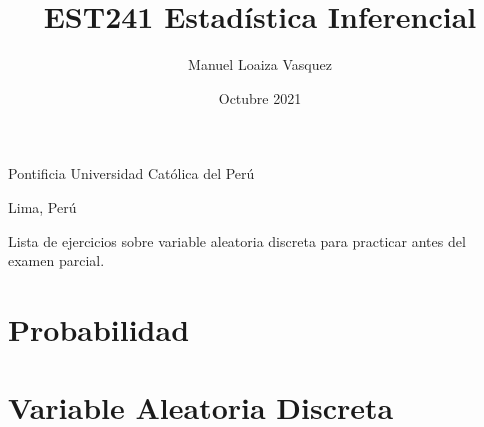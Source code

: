 \title{EST241 Estad\'istica Inferencial}
\author{Manuel Loaiza Vasquez}
\date{Octubre 2021}



\maketitle

\vspace*{-0.25in}
\centerline{Pontificia Universidad Cat\'olica del Per\'u}
\centerline{Lima, Per\'u}
\centerline{}
\vspace*{0.15in}

\begin{framed}
    Lista de ejercicios sobre variable aleatoria discreta para practicar antes del examen parcial.
\end{framed}

\section{Probabilidad}















\section{Variable Aleatoria Discreta}













